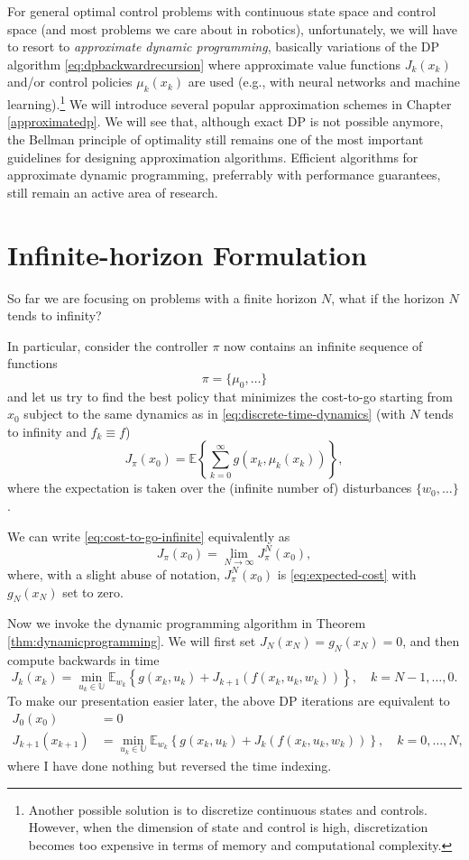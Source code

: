 \documentclass[
]{book}
\theoremstyle{definition}
\theoremstyle{definition}
\theoremstyle{definition}
\theoremstyle{definition}
\theoremstyle{remark}
\begin{document}
For general optimal control problems with continuous state space and control space (and most problems we care about in robotics), unfortunately, we will have to resort to \emph{approximate dynamic programming}, basically variations of the DP algorithm \eqref{eq:dpbackwardrecursion} where approximate value functions \(J_k(x_k)\) and/or control policies \(\mu_k(x_k)\) are used (e.g., with neural networks and machine learning).\footnote{Another possible solution is to discretize continuous states and controls. However, when the dimension of state and control is high, discretization becomes too expensive in terms of memory and computational complexity.} We will introduce several popular approximation schemes in Chapter \ref{approximatedp}. We will see that, although exact DP is not possible anymore, the Bellman principle of optimality still remains one of the most important guidelines for designing approximation algorithms. Efficient algorithms for approximate dynamic programming, preferrably with performance guarantees, still remain an active area of research.

\hypertarget{infinite-horizon}{%
\section{Infinite-horizon Formulation}\label{infinite-horizon}}

So far we are focusing on problems with a finite horizon \(N\), what if the horizon \(N\) tends to infinity?

In particular, consider the controller \(\pi\) now contains an infinite sequence of functions
\[
\pi = \{ \mu_0,\dots \}
\]
and let us try to find the best policy that minimizes the cost-to-go starting from \(x_0\) subject to the same dynamics as in \eqref{eq:discrete-time-dynamics} (with \(N\) tends to infinity and \(f_k \equiv f\))
\begin{equation}
J_{\pi}(x_0) = \mathbb{E} \left\{ \sum_{k=0}^{\infty} g(x_k, \mu_k(x_k)) \right\}
\label{eq:cost-to-go-infinite},
\end{equation}
where the expectation is taken over the (infinite number of) disturbances \(\{w_0,\dots \}\).

We can write \eqref{eq:cost-to-go-infinite} equivalently as
\[
J_{\pi}(x_0) = \lim_{N \rightarrow \infty} J_\pi^N(x_0),
\]
where, with a slight abuse of notation, \(J_\pi^N(x_0)\) is \eqref{eq:expected-cost} with \(g_N(x_N)\) set to zero.

Now we invoke the dynamic programming algorithm in Theorem \ref{thm:dynamicprogramming}. We will first set \(J_N(x_N) = g_N(x_N)=0\), and then compute backwards in time
\[
J_k(x_k) = \min_{u_k \in \mathbb{U}} \mathbb{E}_{w_k} \left\{ g(x_k,u_k) + J_{k+1}(f(x_k,u_k,w_k)) \right\}, \quad k=N-1,\dots,0.
\]
To make our presentation easier later, the above DP iterations are equivalent to
\begin{align}
J_0(x_0) &= 0 \\
J_{k+1}(x_{k+1}) &= \min_{u_k \in \mathbb{U}} \mathbb{E}_{w_k} \left\{ g(x_k,u_k) + J_k(f(x_k,u_k,w_k))  \right\}, \quad k=0,\dots,N, \label{eq:dp-infinite-reversed}
\end{align}
where I have done nothing but reversed the time indexing.
\end{document}
